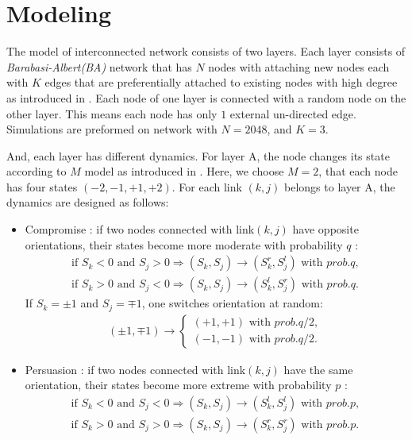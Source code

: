 \documentclass[review]{elsarticle}
\begin{document}
\section{Modeling}
\label{modeling}
The model of interconnected network consists of two layers. Each layer consists of \textit{Barabasi-Albert(BA)} network that has $N$ nodes with attaching new nodes each with $K$ edges that are preferentially attached to existing nodes with high degree as introduced in \cite{barabasi1999}. Each node of one layer is connected with a random node on the other layer. This means each node has only $1$ external un-directed edge. Simulations are preformed on network with $N=2048$, and $K = 3$.

And, each layer has different dynamics. For layer A, the node changes its state according to $M$ model as introduced in \cite{rocca2014}. Here, we choose $M=2$, that each node has four states $(-2, -1, +1, +2)$. For each link $(k, j)$ belongs to layer A,  the dynamics are designed as follows:
\begin{itemize}
	\item Compromise : if two nodes connected with link$(k, j)$ have opposite orientations, their states become more moderate with probability $q$ :
	\begin{align}
	\mbox{if } S_k<0 \mbox{ and } S_j>0  \Rightarrow (S_k, S_j) \rightarrow (S_k^r, S_j^l) \mbox{ with } prob.q,\\
	\mbox{if } S_k>0 \mbox{ and } S_j<0  \Rightarrow (S_k, S_j) \rightarrow (S_k^l, S_j^r) \mbox{ with } prob.q.
	\end{align}
	If $S_k = \pm1$ and $S_j = \mp1$, one switches orientation at random:
	\begin{align}
	(\pm 1, \mp 1)\rightarrow \left\{\begin{matrix}
	(+1, +1) \mbox{ with } prob.q/2,
	\\(-1, -1)\mbox{ with } prob.q/2.
	\end{matrix}\right.
	\end{align}
	\item Persuasion : if two nodes connected with link$(k, j)$ have the same orientation, their states become more extreme with probability $p$ :
	\begin{align}
	\mbox{if } S_k<0 \mbox{ and } S_j<0  \Rightarrow (S_k, S_j) \rightarrow (S_k^l, S_j^l) \mbox{ with } prob.p,\\
	\mbox{if } S_k>0 \mbox{ and } S_j>0  \Rightarrow (S_k, S_j) \rightarrow (S_k^r, S_j^r) \mbox{ with } prob.p.
	\end{align}
\end{itemize}
\end{document}
